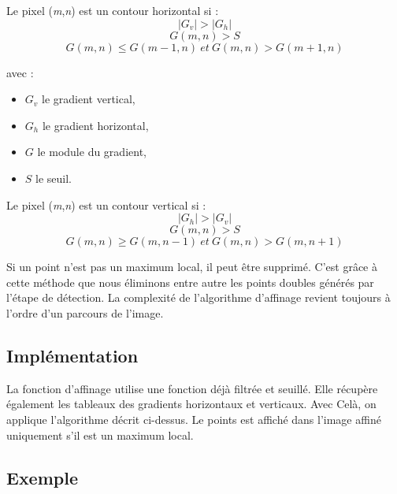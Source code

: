 \documentclass[11pt]{article}
\begin{document}
		Le pixel (\textit{m},\textit{n}) est un contour horizontal si : \\
		$$
			|G_{v}| > |G_{h}| 
		$$	
		$$
			G(m,n) > S 
		$$	
		$$
			G(m,n) \le G(m - 1, n)\ et\ G(m, n) > G(m + 1, n) 
	    $$

	    avec : 
	    \begin{itemize}
		    \item $G_{v}$ le gradient vertical,
		    \item $G_{h}$ le gradient horizontal,
		    \item $G$ le module du gradient,
		    \item $S$ le seuil.

	    \end{itemize}

	    Le pixel (\textit{m},\textit{n}) est un contour vertical si : \\
		$$
			|G_{h}| > |G_{v}| 
		$$	
		$$
			G(m,n) > S 
		$$	
		$$
			G(m,n) \ge G(m, n - 1)\ et\ G(m, n) > G(m , n + 1) 
	    $$


	    Si un point n'est pas un maximum local, il peut être supprimé. 
	    C’est grâce à cette méthode que nous éliminons entre autre les points doubles générés par l’étape de détection. 
	    La complexité de l’algorithme d’affinage revient toujours à l’ordre d’un parcours de l’image.

    \subsection{Implémentation}

    	La fonction d'affinage utilise une fonction déjà filtrée et seuillé.
    	Elle récupère également les tableaux des gradients horizontaux et verticaux.
    	Avec Celà, on applique l'algorithme décrit ci-dessus.
    	Le points est affiché dans l'image affiné uniquement s'il est un maximum local.

    \subsection{Exemple}
\end{document}
